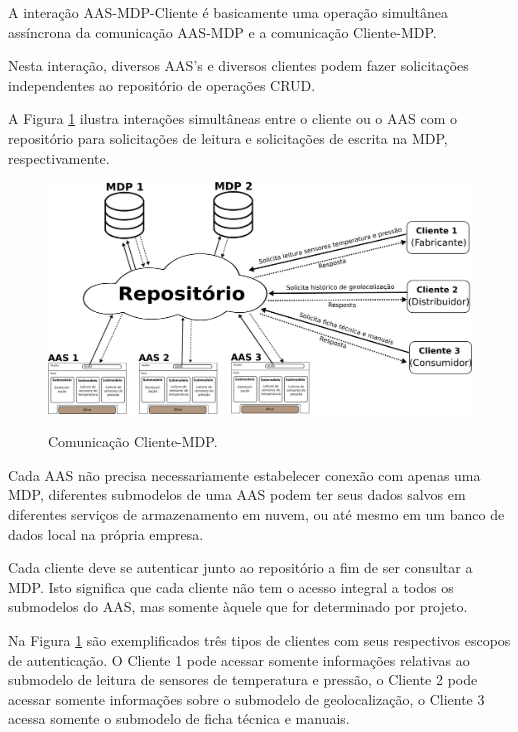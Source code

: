\documentclass[
	12pt,				%
	oneside,			%
	a4paper,			%
	english,			%
	brazil				%
]{abntex2}
\begin{document}
	A interação AAS-MDP-Cliente é basicamente uma operação simultânea assíncrona da comunicação AAS-MDP e a comunicação Cliente-MDP.
	
	Nesta interação, diversos AAS's e diversos clientes podem fazer solicitações independentes ao repositório de operações CRUD.
	
	A Figura \ref{fig:aas-mdp-cliente} ilustra interações simultâneas entre o cliente ou o AAS com o repositório para solicitações de leitura e solicitações de escrita na MDP, respectivamente.
	
	\begin{figure}[H]
		\centering
		\caption{Comunicação Cliente-MDP.}
		\includegraphics[width=1\textwidth]{aas-mdp-cliente.png}
		\label{fig:aas-mdp-cliente}
	\end{figure}

	Cada AAS não precisa necessariamente estabelecer conexão com apenas uma MDP, diferentes submodelos de uma AAS podem ter seus dados salvos em diferentes serviços de armazenamento em nuvem, ou até mesmo em um banco de dados local na própria empresa.
	
	Cada cliente deve se autenticar junto ao repositório a fim de ser consultar a MDP. Isto significa que cada cliente não tem o acesso integral a todos os submodelos do AAS, mas somente àquele que for determinado por projeto.
	
	Na Figura \ref{fig:aas-mdp-cliente} são exemplificados três tipos de clientes com seus respectivos escopos de autenticação. O Cliente 1 pode acessar somente informações relativas ao submodelo de leitura de sensores de temperatura e pressão, o Cliente 2 pode acessar somente informações sobre o submodelo de geolocalização, o Cliente 3 acessa somente o submodelo de ficha técnica e manuais.
	
	
	
\end{document}
